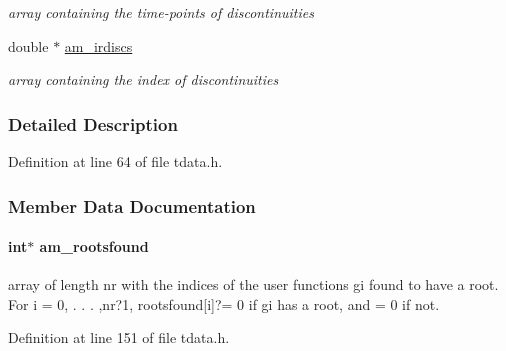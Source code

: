 \begin{DoxyCompactItemize}
\begin{DoxyCompactList}\small\item\em array containing the time-\/points of discontinuities \end{DoxyCompactList}\item 
\hypertarget{struct_temp_data_acc5701e8db7a06ab4614f4008da870fe}{}double $\ast$ \hyperlink{struct_temp_data_acc5701e8db7a06ab4614f4008da870fe}{am\+\_\+irdiscs}\label{struct_temp_data_acc5701e8db7a06ab4614f4008da870fe}

\begin{DoxyCompactList}\small\item\em array containing the index of discontinuities \end{DoxyCompactList}\end{DoxyCompactItemize}


\subsubsection{Detailed Description}


Definition at line 64 of file tdata.\+h.



\subsubsection{Member Data Documentation}
\hypertarget{struct_temp_data_a7aead84117fd84087a23d968ea56b542}{}
\paragraph[{am\+\_\+rootsfound}]{\setlength{\rightskip}{0pt plus 5cm}int$\ast$ am\+\_\+rootsfound}\label{struct_temp_data_a7aead84117fd84087a23d968ea56b542}
array of length nr with the indices of the user functions gi found to have a root. For i = 0, . . . ,nr?1, rootsfound\mbox{[}i\mbox{]}?= 0 if gi has a root, and = 0 if not. 

Definition at line 151 of file tdata.\+h.

